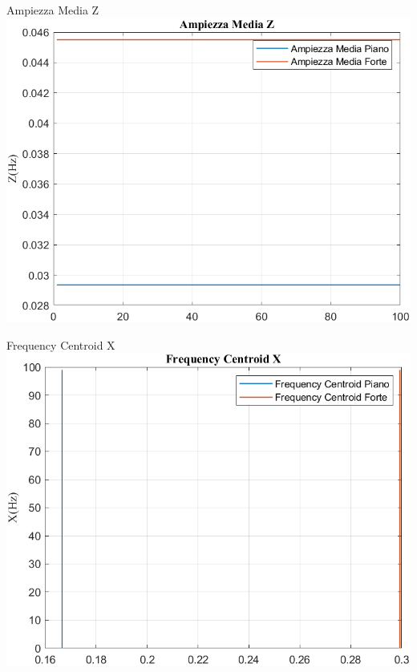 	\begin{frame}{{Ampiezza Media Z}}
		\centering\includegraphics[height=.8\textheight]{figure/Mag/Trasformata/Ampiezza MediaZ}
	\end{frame}
	
	\begin{frame}{{Frequency Centroid X}}
		\centering\includegraphics[height=.8\textheight]{figure/Mag/Trasformata/Frequency CentroidX}
	\end{frame}
	
